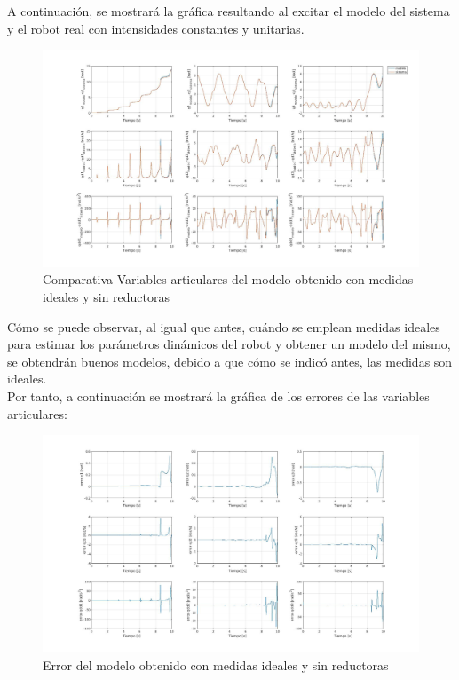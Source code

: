 A continuación, se mostrará la gráfica resultando al excitar el modelo del sistema y el robot real con intensidades constantes y unitarias.



\newpage

\begin{figure}[h!]
	
	\centering
	
	\includegraphics[width=1\textwidth]{EstimacParam_SisMod_In1_IdealSR}
	
	\caption{Comparativa Variables articulares del modelo obtenido con medidas ideales y sin reductoras}
	
\end{figure}



Cómo se puede observar, al igual que antes, cuándo se emplean medidas ideales para estimar los parámetros dinámicos del robot y obtener un modelo del mismo, se obtendrán buenos modelos, debido a que cómo se indicó antes, las medidas son ideales. \\

Por tanto, a continuación se mostrará la gráfica de los errores de las variables articulares:



\begin{figure}[h!]
	
	\centering
	
	\includegraphics[width=1\textwidth]{EstimacParam_SisModError_In1_IdealSR}
	
	\caption{Error del modelo obtenido con medidas ideales y sin reductoras}
	
\end{figure}



